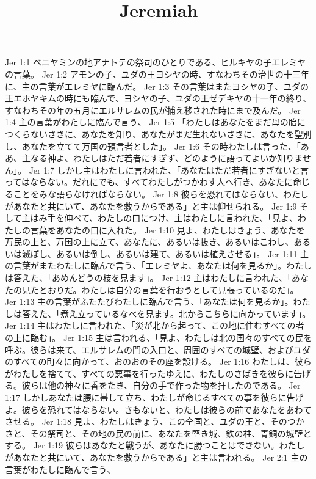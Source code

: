 

\title{Jeremiah}

Jer 1:1  ベニヤミンの地アナトテの祭司のひとりである、ヒルキヤの子エレミヤの言葉。
Jer 1:2  アモンの子、ユダの王ヨシヤの時、すなわちその治世の十三年に、主の言葉がエレミヤに臨んだ。
Jer 1:3  その言葉はまたヨシヤの子、ユダの王エホヤキムの時にも臨んで、ヨシヤの子、ユダの王ゼデキヤの十一年の終り、すなわちその年の五月にエルサレムの民が捕え移された時にまで及んだ。
Jer 1:4  主の言葉がわたしに臨んで言う、
Jer 1:5  「わたしはあなたをまだ母の胎につくらないさきに、あなたを知り、あなたがまだ生れないさきに、あなたを聖別し、あなたを立てて万国の預言者とした」。
Jer 1:6  その時わたしは言った、「ああ、主なる神よ、わたしはただ若者にすぎず、どのように語ってよいか知りません」。
Jer 1:7  しかし主はわたしに言われた、「あなたはただ若者にすぎないと言ってはならない。だれにでも、すべてわたしがつかわす人へ行き、あなたに命じることをみな語らなければならない。
Jer 1:8  彼らを恐れてはならない、わたしがあなたと共にいて、あなたを救うからである」と主は仰せられる。
Jer 1:9  そして主はみ手を伸べて、わたしの口につけ、主はわたしに言われた、「見よ、わたしの言葉をあなたの口に入れた。
Jer 1:10  見よ、わたしはきょう、あなたを万民の上と、万国の上に立て、あなたに、あるいは抜き、あるいはこわし、あるいは滅ぼし、あるいは倒し、あるいは建て、あるいは植えさせる」。
Jer 1:11  主の言葉がまたわたしに臨んで言う、「エレミヤよ、あなたは何を見るか」。わたしは答えた、「あめんどうの枝を見ます」。
Jer 1:12  主はわたしに言われた、「あなたの見たとおりだ。わたしは自分の言葉を行おうとして見張っているのだ」。
Jer 1:13  主の言葉がふたたびわたしに臨んで言う、「あなたは何を見るか」。わたしは答えた、「煮え立っているなべを見ます。北からこちらに向かっています」。
Jer 1:14  主はわたしに言われた、「災が北から起って、この地に住むすべての者の上に臨む」。
Jer 1:15  主は言われる、「見よ、わたしは北の国々のすべての民を呼ぶ。彼らは来て、エルサレムの門の入口と、周囲のすべての城壁、およびユダのすべての町々に向かって、おのおのその座を設ける。
Jer 1:16  わたしは、彼らがわたしを捨てて、すべての悪事を行ったゆえに、わたしのさばきを彼らに告げる。彼らは他の神々に香をたき、自分の手で作った物を拝したのである。
Jer 1:17  しかしあなたは腰に帯して立ち、わたしが命じるすべての事を彼らに告げよ。彼らを恐れてはならない。さもないと、わたしは彼らの前であなたをあわてさせる。
Jer 1:18  見よ、わたしはきょう、この全国と、ユダの王と、そのつかさと、その祭司と、その地の民の前に、あなたを堅き城、鉄の柱、青銅の城壁とする。
Jer 1:19  彼らはあなたと戦うが、あなたに勝つことはできない。わたしがあなたと共にいて、あなたを救うからである」と主は言われる。
Jer 2:1  主の言葉がわたしに臨んで言う、
